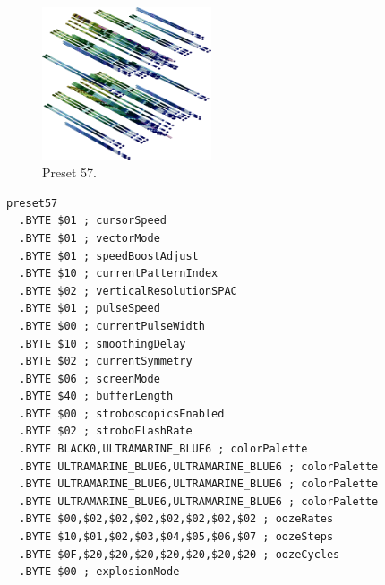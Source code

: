 \clearpage
\begin{minipage}[b]{0.48\linewidth}
\begin{figure}[H]                                                          
  \centering                                                             
  \begin{adjustbox}{width=5cm,center}                                   
  \includegraphics[width=5cm]{src/colorspace_presets/preset57-45.png}%
  \end{adjustbox}                                                        
\caption*{Preset 57.}                                           
\end{figure}                                                               
\end{minipage}
\hspace{0.1cm}
\begin{minipage}[b]{0.48\linewidth}                            
\begin{lstlisting}[basicstyle=\ttfamily\tiny]
preset57
  .BYTE $01 ; cursorSpeed
  .BYTE $01 ; vectorMode
  .BYTE $01 ; speedBoostAdjust
  .BYTE $10 ; currentPatternIndex
  .BYTE $02 ; verticalResolutionSPAC
  .BYTE $01 ; pulseSpeed
  .BYTE $00 ; currentPulseWidth
  .BYTE $10 ; smoothingDelay
  .BYTE $02 ; currentSymmetry
  .BYTE $06 ; screenMode
  .BYTE $40 ; bufferLength
  .BYTE $00 ; stroboscopicsEnabled
  .BYTE $02 ; stroboFlashRate
  .BYTE BLACK0,ULTRAMARINE_BLUE6 ; colorPalette
  .BYTE ULTRAMARINE_BLUE6,ULTRAMARINE_BLUE6 ; colorPalette
  .BYTE ULTRAMARINE_BLUE6,ULTRAMARINE_BLUE6 ; colorPalette
  .BYTE ULTRAMARINE_BLUE6,ULTRAMARINE_BLUE6 ; colorPalette
  .BYTE $00,$02,$02,$02,$02,$02,$02,$02 ; oozeRates
  .BYTE $10,$01,$02,$03,$04,$05,$06,$07 ; oozeSteps
  .BYTE $0F,$20,$20,$20,$20,$20,$20,$20 ; oozeCycles
  .BYTE $00 ; explosionMode
\end{lstlisting}
\end{minipage}

\vspace*{-0.5cm}

